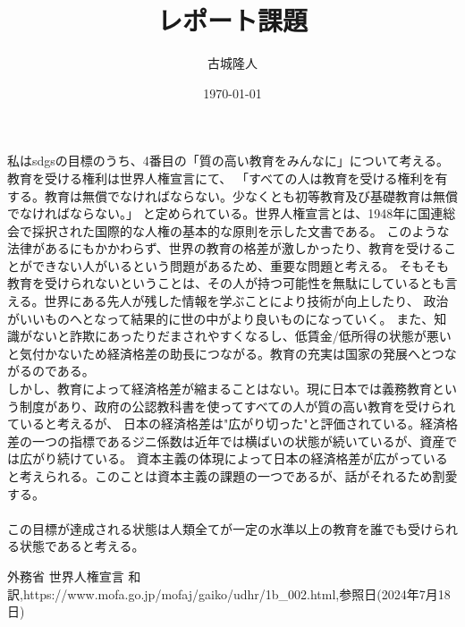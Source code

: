 \documentclass[a4paper,11pt]{jsarticle}
\begin{document}
\title{レポート課題}
\author{古城隆人}
\date{\today}
\maketitle

\newpage
私はsdgsの目標のうち、4番目の「質の高い教育をみんなに」について考える。
教育を受ける権利は世界人権宣言にて、
「すべての人は教育を受ける権利を有する。教育は無償でなければならない。少なくとも初等教育及び基礎教育は無償でなければならない。」\cite{zinken}
と定められている。世界人権宣言とは、1948年に国連総会で採択された国際的な人権の基本的な原則を示した文書である。
このような法律があるにもかかわらず、世界の教育の格差が激しかったり、教育を受けることができない人がいるという問題があるため、重要な問題と考える。
そもそも教育を受けられないということは、その人が持つ可能性を無駄にしているとも言える。世界にある先人が残した情報を学ぶことにより技術が向上したり、
政治がいいものへとなって結果的に世の中がより良いものになっていく。
また、知識がないと詐欺にあったりだまされやすくなるし、低賃金/低所得の状態が悪いと気付かないため経済格差の助長につながる。教育の充実は国家の発展へとつながるのである。\\
しかし、教育によって経済格差が縮まることはない。現に日本では義務教育という制度があり、政府の公認教科書を使ってすべての人が質の高い教育を受けられていると考えるが、
日本の経済格差は"広がり切った"と評価されている。経済格差の一つの指標であるジニ係数は近年では横ばいの状態が続いているが、資産では広がり続けている。
資本主義の体現によって日本の経済格差が広がっていると考えられる。このことは資本主義の課題の一つであるが、話がそれるため割愛する。\\
\\
この目標が達成される状態は人類全てが一定の水準以上の教育を誰でも受けられる状態であると考える。

\begin{thebibliography}{99}
   外務省 世界人権宣言 和訳,https://www.mofa.go.jp/mofaj/gaiko/udhr/1b\_002.html,参照日(2024年7月18日)
\end{thebibliography}  
\end{document}
